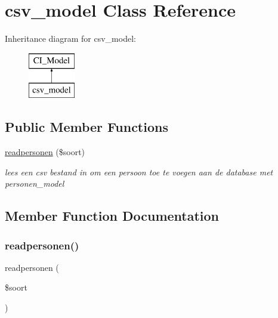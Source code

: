 \hypertarget{classcsv__model}{}\section{csv\+\_\+model Class Reference}
\label{classcsv__model}
Inheritance diagram for csv\+\_\+model\+:\begin{figure}[H]
\begin{center}
\leavevmode
\includegraphics[height=2.000000cm]{classcsv__model}
\end{center}
\end{figure}
\subsection*{Public Member Functions}
\begin{DoxyCompactItemize}
\item 
\mbox{\hyperlink{classcsv__model_a0982b277c56508192bc564cd095e9541}{readpersonen}} (\$soort)
\begin{DoxyCompactList}\small\item\em lees een csv bestand in om een persoon toe te voegen aan de database met personen\+\_\+model \end{DoxyCompactList}\end{DoxyCompactItemize}


\subsection{Member Function Documentation}
\mbox{\label{classcsv__model_a0982b277c56508192bc564cd095e9541}} 
\subsubsection{\texorpdfstring{readpersonen()}{readpersonen()}}
{\footnotesize\ttfamily readpersonen (\begin{DoxyParamCaption}\item[{}]{\$soort }\end{DoxyParamCaption})}




